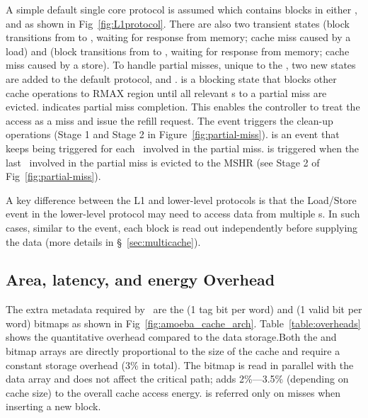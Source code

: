 \clearpage

A simple default single core protocol is assumed which contains blocks in either ,  and  as shown in Fig~\ref{fig:L1protocol}. There are also two transient states (block transitions from  to , waiting for  response from memory; cache miss caused by a load) and (block transitions from  to , waiting for  response from memory; cache miss caused by a store). To handle partial misses, unique to the \AC{}, two new states are added to the default protocol,  and .  is a blocking state that blocks other cache operations to RMAX region until all relevant \AB{}s to a partial miss are evicted.  indicates partial miss completion. This enables the controller to treat the access as a miss and issue the refill request. The  event triggers the clean-up operations (Stage 1 and Stage 2 in Figure~\ref{fig:partial-miss}).  is an event that keeps being triggered for each \AB\ involved in the partial miss.  is triggered when the last \AB\ involved in the partial miss is evicted to the MSHR (see Stage 2 of Fig~\ref{fig:partial-miss}).

A key difference between the L1 and lower-level protocols is that the Load/Store event in the lower-level protocol may need to access data from multiple \AB{}s. In such cases, similar to the  event, each block is read out independently before supplying the data (more details in \S~\ref{sec:multicache}).

\subsection{Area, latency, and energy Overhead}
\label{sec:area_latency_energy_overhead}

The extra metadata required by \AC\ are the (1 tag bit per word) and (1 valid bit per word) bitmaps as shown in Fig~\ref{fig:amoeba_cache_arch}. Table~\ref{table:overheads} shows the quantitative overhead compared to the data storage.Both the  and  bitmap arrays are directly proportional to the size of the cache and require a constant storage overhead (3\% in total). The  bitmap is read in parallel with the data array and does not affect the critical path;  adds 2\%---3.5\% (depending on cache size) to the overall cache access energy. is referred only on misses when inserting a new block.

